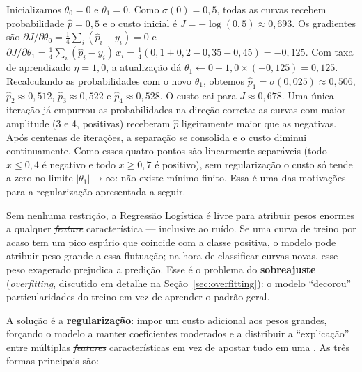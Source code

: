\documentclass[msc]{on} %
\makeatletter
\providecommand{\DIFaddtex}[1]{{\protect\color{red}#1}} %
\providecommand{\DIFdeltex}[1]{{\protect\color{red}\sout{#1}}} %
\providecommand{\DIFaddbegin}{} %
\providecommand{\DIFaddend}{} %
\providecommand{\DIFdelbegin}{} %
\providecommand{\DIFdelend}{} %
\providecommand{\DIFadd}[1]{\texorpdfstring{\DIFaddtex{#1}}{#1}} %
\providecommand{\DIFdel}[1]{\texorpdfstring{\DIFdeltex{#1}}{}} %
\let\sout@orig\sout %
\renewcommand{\sout}[1]{\ifmmode\text{\sout@orig{\ensuremath{#1}}}\else\sout@orig{#1}\fi} %
\makeatother
\begin{document}
Inicializamos $\theta_0 = 0$ e $\theta_1 = 0$. Como $\sigma(0) = 0{,}5$, todas as curvas recebem probabilidade $\hat{p} = 0{,}5$ e o custo inicial é $J = -\log(0{,}5) \approx 0{,}693$. Os gradientes são $\partial J / \partial \theta_0 = \frac{1}{4}\sum_i (\hat{p}_i - y_i) = 0$ e $\partial J / \partial \theta_1 = \frac{1}{4}\sum_i (\hat{p}_i - y_i)\,x_i = \frac{1}{4}(0{,}1 + 0{,}2 - 0{,}35 - 0{,}45) = -0{,}125$. Com taxa de aprendizado $\eta = 1{,}0$, a atualização dá $\theta_1 \leftarrow 0 - 1{,}0 \times (-0{,}125) = 0{,}125$. Recalculando as probabilidades com o novo $\theta_1$, obtemos $\hat{p}_1 = \sigma(0{,}025) \approx 0{,}506$, $\hat{p}_2 \approx 0{,}512$, $\hat{p}_3 \approx 0{,}522$ e $\hat{p}_4 \approx 0{,}528$. O custo cai para $J \approx 0{,}678$. Uma única iteração já empurrou as probabilidades na direção correta: as curvas com maior amplitude (3 e 4, positivas) receberam $\hat{p}$ ligeiramente maior que as negativas. Após centenas de iterações, a separação se consolida e o custo diminui continuamente. Como esses quatro pontos são linearmente separáveis (todo $x \le 0{,}4$ é negativo e todo $x \ge 0{,}7$ é positivo), sem regularização o custo só tende a zero no limite $|\theta_1| \to \infty$: não existe mínimo finito. Essa é uma das motivações para a regularização apresentada a seguir.
\vspace{0.3cm}

Sem nenhuma restrição, a Regressão Logística é livre para atribuir pesos enormes a qualquer \DIFdelbegin \textit{\DIFdel{feature}} %
\DIFdelend\ifhmode\hskip0pt\fi \DIFaddbegin \DIFadd{característica }\DIFaddend --- inclusive ao ruído. Se uma curva de treino por acaso tem um pico espúrio que coincide com a classe positiva, o modelo pode atribuir peso grande a essa flutuação; na hora de classificar curvas novas, esse peso exagerado prejudica a predição. Esse é o problema do \textbf{sobreajuste} (\textit{overfitting}, discutido em detalhe na Seção~\ref{sec:overfitting}): o modelo ``decorou'' particularidades do treino em vez de aprender o padrão geral.

A solução é a \textbf{regularização}: impor um custo adicional aos pesos grandes, forçando o modelo a manter coeficientes moderados e a distribuir a ``explicação'' entre múltiplas \DIFdelbegin \textit{\DIFdel{features}} %
\DIFdelend\ifhmode\hskip0pt\fi \DIFaddbegin \DIFadd{características }\DIFaddend em vez de apostar tudo em uma \citep{geron2019maos, Levada2026}. As três formas principais são:
\end{document}
